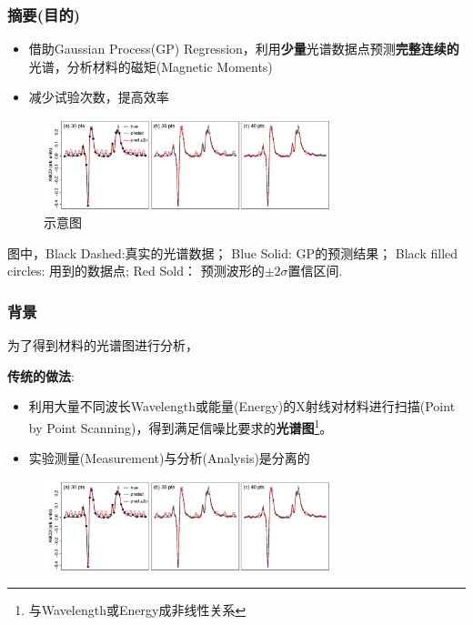 \documentclass{beamer}
\begin{document}
\begin{frame}
\frametitle{摘要(目的)}
\begin{itemize}	
\item 借助Gaussian Process(GP) Regression，利用\textbf{少量}光谱数据点预测\textbf{完整连续的}光谱，分析材料的磁矩(Magnetic Moments)
\item 减少试验次数，提高效率
\end{itemize}

\begin{figure}[!b]
\centering
\includegraphics[width=0.75\textwidth]{Materials/Sepctroscopy1.png}
\caption{示意图}
\end{figure}
图中，Black Dashed:真实的光谱数据； Blue Solid: GP的预测结果； Black filled circles: 用到的数据点; Red Sold： 预测波形的$\pm 2\sigma$置信区间.
\end{frame}

\begin{frame}
\frametitle{背景}
为了得到材料的光谱图进行分析，

\textbf{传统的做法}:
\begin{itemize}
\item 利用大量不同波长Wavelength或能量(Energy)的X射线对材料进行扫描(Point by Point Scanning)，得到满足信噪比要求的\textbf{光谱图}\footnote{与Wavelength或Energy成非线性关系}。
\item 实验测量(Measurement)与分析(Analysis)是分离的
\end{itemize}
\begin{figure}[!b]
\centering
\includegraphics[width=0.75\textwidth]{Materials/Sepctroscopy1.png}
\end{figure}

\end{frame}
\end{document}
